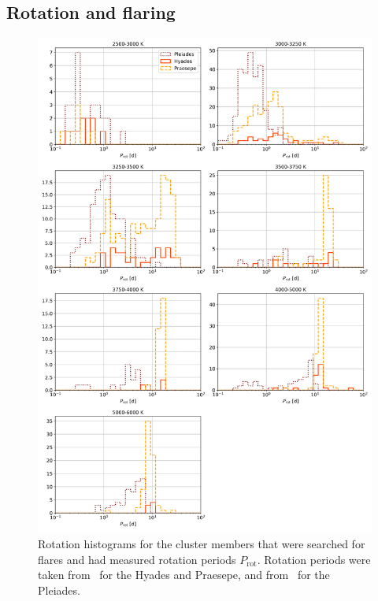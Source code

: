 \documentclass{aa}
\begin{document}
\begin{appendix}
\section{Rotation and flaring}

   \begin{figure}
   \centering
            \includegraphics[width=16cm]{pics/rotation/SpT_wise_rotation.png}
         \caption{Rotation histograms for the cluster members that were searched for flares and had measured rotation periods $P_\mathrm{rot}$. Rotation periods were taken from~\citet{douglas2019} for the Hyades and Praesepe, and from~\citet{rebull_pleiadesrot_2016} for the Pleiades.}
          \label{fig:rotation_histogram}

\end{figure}
\end{appendix}
\end{document}
